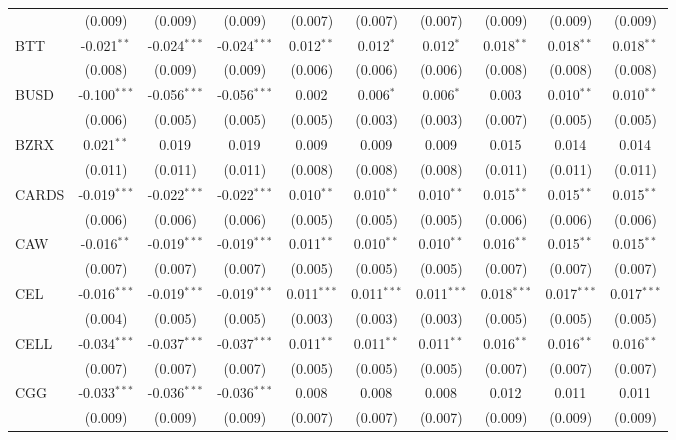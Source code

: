 \begin{table}[!htbp]
\begin{tabular}{@{\extracolsep{5pt}}lccccccccc}
  & (0.009) & (0.009) & (0.009) & (0.007) & (0.007) & (0.007) & (0.009) & (0.009) & (0.009) \\
 BTT & -0.021$^{**}$ & -0.024$^{***}$ & -0.024$^{***}$ & 0.012$^{**}$ & 0.012$^{*}$ & 0.012$^{*}$ & 0.018$^{**}$ & 0.018$^{**}$ & 0.018$^{**}$ \\
  & (0.008) & (0.009) & (0.009) & (0.006) & (0.006) & (0.006) & (0.008) & (0.008) & (0.008) \\
 BUSD & -0.100$^{***}$ & -0.056$^{***}$ & -0.056$^{***}$ & 0.002$^{}$ & 0.006$^{*}$ & 0.006$^{*}$ & 0.003$^{}$ & 0.010$^{**}$ & 0.010$^{**}$ \\
  & (0.006) & (0.005) & (0.005) & (0.005) & (0.003) & (0.003) & (0.007) & (0.005) & (0.005) \\
 BZRX & 0.021$^{**}$ & 0.019$^{}$ & 0.019$^{}$ & 0.009$^{}$ & 0.009$^{}$ & 0.009$^{}$ & 0.015$^{}$ & 0.014$^{}$ & 0.014$^{}$ \\
  & (0.011) & (0.011) & (0.011) & (0.008) & (0.008) & (0.008) & (0.011) & (0.011) & (0.011) \\
 CARDS & -0.019$^{***}$ & -0.022$^{***}$ & -0.022$^{***}$ & 0.010$^{**}$ & 0.010$^{**}$ & 0.010$^{**}$ & 0.015$^{**}$ & 0.015$^{**}$ & 0.015$^{**}$ \\
  & (0.006) & (0.006) & (0.006) & (0.005) & (0.005) & (0.005) & (0.006) & (0.006) & (0.006) \\
 CAW & -0.016$^{**}$ & -0.019$^{***}$ & -0.019$^{***}$ & 0.011$^{**}$ & 0.010$^{**}$ & 0.010$^{**}$ & 0.016$^{**}$ & 0.015$^{**}$ & 0.015$^{**}$ \\
  & (0.007) & (0.007) & (0.007) & (0.005) & (0.005) & (0.005) & (0.007) & (0.007) & (0.007) \\
 CEL & -0.016$^{***}$ & -0.019$^{***}$ & -0.019$^{***}$ & 0.011$^{***}$ & 0.011$^{***}$ & 0.011$^{***}$ & 0.018$^{***}$ & 0.017$^{***}$ & 0.017$^{***}$ \\
  & (0.004) & (0.005) & (0.005) & (0.003) & (0.003) & (0.003) & (0.005) & (0.005) & (0.005) \\
 CELL & -0.034$^{***}$ & -0.037$^{***}$ & -0.037$^{***}$ & 0.011$^{**}$ & 0.011$^{**}$ & 0.011$^{**}$ & 0.016$^{**}$ & 0.016$^{**}$ & 0.016$^{**}$ \\
  & (0.007) & (0.007) & (0.007) & (0.005) & (0.005) & (0.005) & (0.007) & (0.007) & (0.007) \\
 CGG & -0.033$^{***}$ & -0.036$^{***}$ & -0.036$^{***}$ & 0.008$^{}$ & 0.008$^{}$ & 0.008$^{}$ & 0.012$^{}$ & 0.011$^{}$ & 0.011$^{}$ \\
  & (0.009) & (0.009) & (0.009) & (0.007) & (0.007) & (0.007) & (0.009) & (0.009) & (0.009) \\

\end{tabular}
\end{table}
